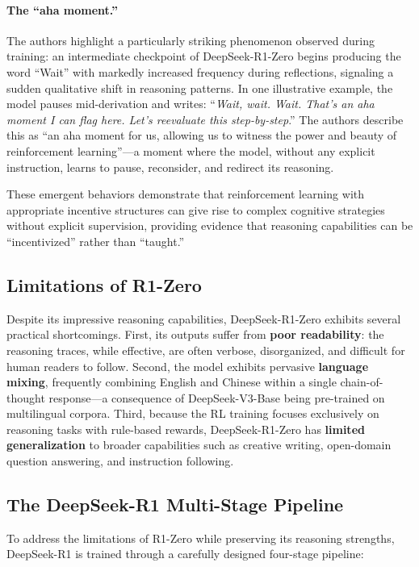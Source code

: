 \paragraph{The ``aha moment.''} The authors highlight a particularly striking
phenomenon observed during training: an intermediate checkpoint of DeepSeek-R1-Zero
begins producing the word ``Wait'' with markedly increased frequency during
reflections, signaling a sudden qualitative shift in reasoning patterns. In one
illustrative example, the model pauses mid-derivation and writes: ``\textit{Wait,
wait. Wait. That's an aha moment I can flag here. Let's reevaluate this
step-by-step}.'' The authors describe this as ``an aha moment for us, allowing us to
witness the power and beauty of reinforcement learning''---a moment where the model,
without any explicit instruction, learns to pause, reconsider, and redirect its
reasoning.

These emergent behaviors demonstrate that reinforcement learning with appropriate
incentive structures can give rise to complex cognitive strategies without explicit
supervision, providing evidence that reasoning capabilities can be ``incentivized''
rather than ``taught.''

\subsection{Limitations of R1-Zero}

Despite its impressive reasoning capabilities, DeepSeek-R1-Zero exhibits several
practical shortcomings. First, its outputs suffer from \textbf{poor readability}: the
reasoning traces, while effective, are often verbose, disorganized, and difficult for
human readers to follow. Second, the model exhibits pervasive \textbf{language
mixing}, frequently combining English and Chinese within a single chain-of-thought
response---a consequence of DeepSeek-V3-Base being pre-trained on multilingual
corpora. Third, because the RL training focuses exclusively on reasoning tasks with
rule-based rewards, DeepSeek-R1-Zero has \textbf{limited generalization} to broader
capabilities such as creative writing, open-domain question answering, and
instruction following.

\subsection{The DeepSeek-R1 Multi-Stage Pipeline}

To address the limitations of R1-Zero while preserving its reasoning strengths,
DeepSeek-R1 is trained through a carefully designed four-stage pipeline:


